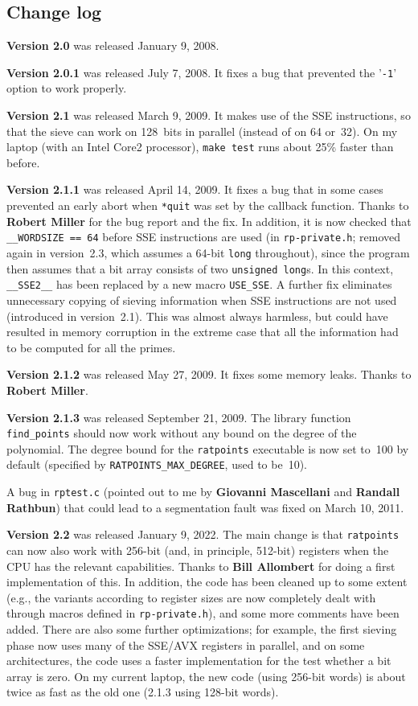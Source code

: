 \documentclass[12pt,a4paper,oneside]{amsart}
\begin{document}
\subsection{Change log}

\textbf{Version 2.0} was released January 9, 2008.

\textbf{Version 2.0.1} was released July 7, 2008. It fixes a bug that prevented the
'\texttt{-1}' option to work properly.

\textbf{Version 2.1} was released March 9, 2009. It makes use of the SSE instructions,
so that the sieve can work on 128~bits in parallel (instead of on 64 or~32).
On my laptop (with an Intel Core2 processor), \texttt{make test} runs about
25\% faster than before.

\textbf{Version 2.1.1} was released April 14, 2009. It fixes a bug that in some
cases prevented an early abort when \texttt{*quit} was set by the callback function.
Thanks to \textbf{Robert Miller} for the bug report and the fix. In addition, it is now
checked that \verb+__WORDSIZE == 64+ before SSE instructions are used
(in \texttt{rp-private.h}; removed again in version~2.3, which assumes a
64-bit \texttt{long} throughout), since the program then assumes that a bit
array consists of two \texttt{unsigned long}s. In this context, \verb+__SSE2__+ has been replaced
by a new macro \verb+USE_SSE+. A further fix eliminates unnecessary copying
of sieving information when SSE instructions are not used (introduced in version~2.1).
This was almost always harmless, but could have resulted in memory corruption
in the extreme case that all the information had to be computed for all the
primes.

\textbf{Version 2.1.2} was released May 27, 2009. It fixes some memory leaks.
Thanks to \textbf{Robert Miller}.

\textbf{Version 2.1.3} was released September 21, 2009. The library function
\verb+find_points+ should now work without any bound on the degree of the
polynomial. The degree bound for the \texttt{ratpoints} executable is now set
to~100 by default (specified by \verb+RATPOINTS_MAX_DEGREE+, used to be~10).

A bug in \texttt{rptest.c} (pointed out to me by \textbf{Giovanni Mascellani}
and \textbf{Randall Rathbun}) that could lead to a segmentation fault was fixed on
March 10, 2011.

\textbf{Version 2.2} was released January 9, 2022. The main change is that
\texttt{ratpoints} can now also work with 256-bit (and, in principle, 512-bit)
registers when the CPU has the relevant capabilities. Thanks to
\textbf{Bill Allombert} for doing a first implementation of this. In addition,
the code has been cleaned up to some extent (e.g., the variants according
to register sizes are now completely dealt with through macros defined
in \texttt{rp-private.h}), and some more comments have been added.
There are also some further optimizations; for example, the first sieving
phase now uses many of the SSE/AVX registers in parallel, and on some
architectures, the code uses a faster implementation for the test whether
a bit array is zero. On my current laptop, the new code (using 256-bit words)
is about twice as fast as the old one (2.1.3 using 128-bit words).
\end{document}
